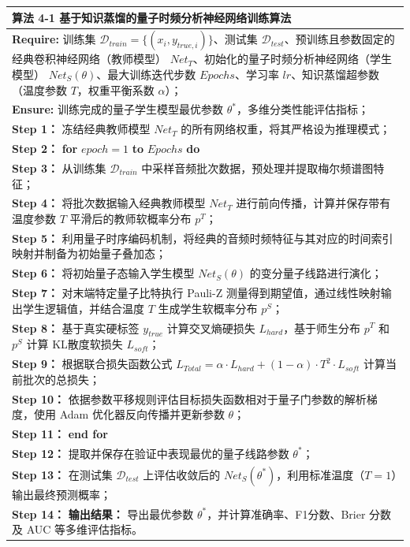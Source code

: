 \begin{table}[!htb]
	\centering
	\renewcommand{\arraystretch}{1.3}
	\begin{tabular}{p{}}
		\toprule
		\textbf{算法 4-1} 基于知识蒸馏的量子时频分析神经网络训练算法 \\
		\midrule
		\textbf{Require:} 训练集 $\mathcal{D}_{train}=\{(x_i, y_{true, i})\}$、测试集 $\mathcal{D}_{test}$、预训练且参数固定的经典卷积神经网络（教师模型） $Net_{T}$、初始化的量子时频分析神经网络（学生模型） $Net_{S}(\theta)$、最大训练迭代步数 $Epochs$、学习率 $lr$、知识蒸馏超参数（温度参数 $T$，权重平衡系数 $\alpha$）； \\
		\textbf{Ensure:} 训练完成的量子学生模型最优参数 $\theta^*$，多维分类性能评估指标； \\
		\textbf{Step 1：} 冻结经典教师模型 $Net_{T}$ 的所有网络权重，将其严格设为推理模式； \\
		\textbf{Step 2：} \textbf{for} $epoch = 1$ \textbf{to} $Epochs$ \textbf{do} \\
		\quad \textbf{Step 3：} 从训练集 $\mathcal{D}_{train}$ 中采样音频批次数据，预处理并提取梅尔频谱图特征； \\
		\quad \textbf{Step 4：} 将批次数据输入经典教师模型 $Net_{T}$ 进行前向传播，计算并保存带有温度参数 $T$ 平滑后的教师软概率分布 $p^T$； \\
		\quad \textbf{Step 5：} 利用量子时序编码机制，将经典的音频时频特征与其对应的时间索引映射并制备为初始量子叠加态； \\
		\quad \textbf{Step 6：} 将初始量子态输入学生模型 $Net_{S}(\theta)$ 的变分量子线路进行演化； \\
		\quad \textbf{Step 7：} 对末端特定量子比特执行 Pauli-Z 测量得到期望值，通过线性映射输出学生逻辑值，并结合温度 $T$ 生成学生软概率分布 $p^S$； \\
		\quad \textbf{Step 8：} 基于真实硬标签 $y_{true}$ 计算交叉熵硬损失 $L_{hard}$，基于师生分布 $p^T$ 和 $p^S$ 计算 KL散度软损失 $L_{soft}$； \\
		\quad \textbf{Step 9：} 根据联合损失函数公式 $L_{Total} = \alpha \cdot L_{hard} + (1 - \alpha) \cdot T^2 \cdot L_{soft}$ 计算当前批次的总损失； \\
		\quad \textbf{Step 10：} 依据参数平移规则评估目标损失函数相对于量子门参数的解析梯度，使用 Adam 优化器反向传播并更新参数 $\theta$； \\
		\textbf{Step 11：} \textbf{end for} \\
		\textbf{Step 12：} 提取并保存在验证中表现最优的量子线路参数 $\theta^*$； \\
		\textbf{Step 13：} 在测试集 $\mathcal{D}_{test}$ 上评估收敛后的 $Net_{S}(\theta^*)$，利用标准温度（$T=1$）输出最终预测概率； \\
		\textbf{Step 14：} \textbf{输出结果：} 导出最优参数 $\theta^*$，并计算准确率、F1分数、Brier 分数及 AUC 等多维评估指标。 \\
		\bottomrule
	\end{tabular}
\end{table}


